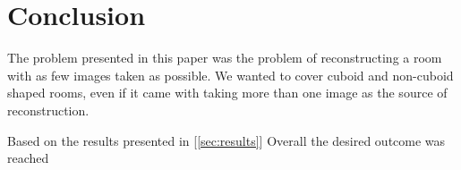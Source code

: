\section{Conclusion}
The problem presented in this paper was the problem of reconstructing a room with as few images taken as possible. We wanted to cover cuboid and non-cuboid shaped rooms, even if it came with taking more than one image as the source of reconstruction. 


Based on the results presented in [\ref{sec:results}]
Overall the desired outcome was reached